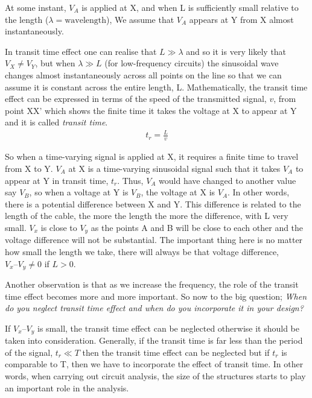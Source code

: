 At some instant, $ V_{A} $ is applied at X, and when L is sufficiently small relative to the length ($  \lambda = \text{wavelength} $), We assume that $ V_{A} $ appears at Y from X almost instantaneously.

In transit time effect one can realise that $ L \gg\lambda$ and so it is very likely that $ V_{X} \neq V_{Y} $, but when $  \lambda \gg L  $ (for low-frequency circuits) the sinusoidal wave changes almost instantaneously across all points on the line so that we can assume it is constant across the entire length, L. Mathematically, the transit time effect can be expressed in terms of the speed of the transmitted signal, $v$, from point XX' which shows the finite time it takes the voltage at X to appear at Y and it is called \textit{transit time}.
\begin{align}
t_{r} = \frac{L}{v}
\label{eqn:transittime}
\end{align}

So when a time-varying signal is applied at X, it requires a finite time to travel from X to Y. $ V_{A} $ at X is a time-varying sinusoidal signal such that it takes $ V_{A} $ to appear at Y in transit time, $t_r$. Thus, $ V_{A} $ would have changed to another value say $ V_{B} $, so when a voltage at Y is $ V_{B} $, the voltage at X is $ V_{A} $. In other words, there is a potential difference between X and Y. This difference is related to the length of the cable, the more the length the more the difference, with L very small. $ V_{x} $ is close to $ V_{y} $ as the points A and B will be close to each other and the voltage difference will not be substantial. The important thing here is no matter how small the length we take, there will always be that voltage difference, $ V_{x} – V_{y} \neq 0 $ if $ L > 0 $.

Another observation is that as we increase the frequency, the role of the transit time effect becomes more and more important. So now to the big question; \textit{When do you neglect transit time effect and when do you incorporate it in your design?}

If $ V_{x} – V_{y} $ is small, the transit time effect can be neglected otherwise it should be taken into consideration. Generally, if the transit time is far less than the period of the signal,  $ t_{r} \ll T $ then the  transit time effect can be neglected but if $ t_{r} $ is comparable to T, then we have to incorporate the effect of transit time. In other words, when carrying out circuit analysis, the size of the structures starts to play an important role in the analysis.

